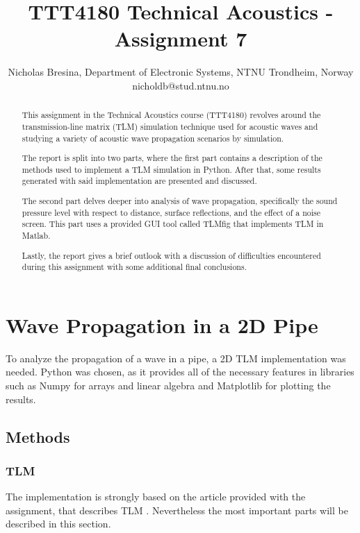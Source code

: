 \documentclass[twocolumn]{article}
\begin{document}
\title{TTT4180 Technical Acoustics - Assignment 7}

\author{Nicholas Bresina, Department of Electronic Systems, NTNU Trondheim, Norway \\
nicholdb@stud.ntnu.no}

\maketitle\thispagestyle{empty}

\begin{abstract}
This assignment in the Technical Acoustics course (TTT4180) revolves around
the transmission-line matrix (TLM) simulation technique used for acoustic waves
and studying a variety of acoustic wave propagation scenarios by simulation.

The report is split into two parts, where the first part contains a 
description of the methods used to implement a TLM simulation in Python.
After that, some results generated with said implementation are presented and discussed.

The second part delves deeper into analysis of wave propagation, specifically the sound pressure
level with respect to distance, surface reflections, and the effect of a noise screen.
This part uses a provided GUI tool called TLMfig that implements TLM in Matlab.

Lastly, the report gives a brief outlook with a discussion of difficulties
encountered during this assignment with some additional final conclusions.
\end{abstract}


\section{Wave Propagation in a 2D Pipe}
To analyze the propagation of a wave in a pipe, a 2D TLM implementation was needed.
Python was chosen, as it provides all of the necessary features in libraries such
as Numpy \cite{NumpyManual} for arrays and linear algebra and Matplotlib \cite{Matplotlib}
for plotting the results.

\subsection{Methods}
\subsubsection{TLM}
The implementation is strongly based on the article provided with the assignment,
that describes TLM \cite{KagawaTLM}.
Nevertheless the most important parts will be described in this section.
\end{document}
